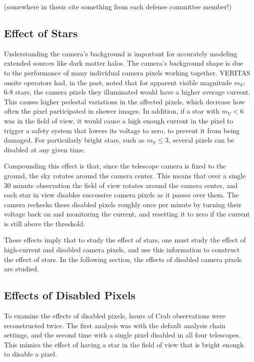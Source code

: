   {\color{red}(somewhere in thesis cite something from each defense committee member!)}
  
  \FloatBarrier

  \subsection{Effect of Stars}
    Understanding the camera's background is important for accurately modeling extended sources like dark matter halos.
    The camera's background shape is due to the performance of many individual camera pixels working together.
    VERITAS onsite operators had, in the past, noted that for apparent visible magnitude $m_V :$ 6-8 stars, the camera pixels they illuminated would have a higher average current.
    This causes higher pedestal variations in the affected pixels, which decrease how often the pixel participated in shower images.
    In addition, if a star with $m_V < 6$ was in the field of view, it would cause a high enough current in the pixel to trigger a safety system that lowers its voltage to zero, to prevent it from being damaged.
    For particularly bright stars, such as $m_V \leq 3$, several pixels can be disabled at any given time.

    Compounding this effect is that, since the telescope camera is fixed to the ground, the sky rotates around the camera center.
    This means that over a single 30 minute observation the field of view rotates around the camera center, and each star in view disables successive camera pixels as it passes over them.
    The camera rechecks these disabled pixels roughly once per minute by turning their voltage back on and monitoring the current, and resetting it to zero if the current is still above the threshold.

    These effects imply that to study the effect of stars, one must study the effect of high-current and disabled camera pixels, and use this information to construct the effect of stars.
    In the following section, the effects of disabled camera pixels are studied.
    
  \subsection{Effects of Disabled Pixels}

    To examine the effects of disabled pixels,  hours of Crab observations were reconstructed twice.
    The first analysis was with the default analysis chain settings, and the second time with a single pixel disabled in all four telescopes.
    This mimics the effect of having a star in the field of view that is bright enough to disable a pixel.

